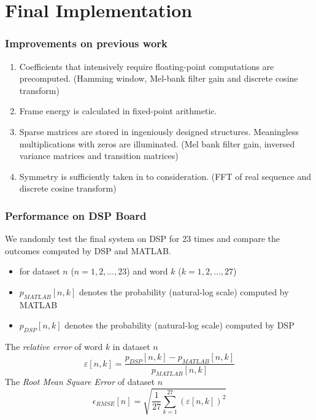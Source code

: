 \section{Final Implementation}


\begin{frame}
\frametitle{Improvements on previous work}
\begin{enumerate}
\item Coefficients that intensively require floating-point computations are precomputed. (Hamming window, Mel-bank filter gain and discrete cosine transform)
\item Frame energy is calculated in fixed-point arithmetic.
\item Sparse matrices are stored in ingeniously designed structures. Meaningless multiplications with zeros are illuminated. (Mel bank filter gain, inversed variance matrices and transition matrices)
\item Symmetry is sufficiently taken in to consideration. (FFT of real sequence and discrete cosine transform)
\end{enumerate}
\end{frame}


\begin{frame}
\frametitle{Performance on DSP Board}
We randomly test the final system on DSP for 23 times and compare the outcomes computed by DSP and MATLAB.
\begin{itemize}
	\item for dataset $n$ ($n = 1, 2, \dots, 23$) and word $k$ ($k = 1, 2, \dots, 27$)
	\item $p_{MATLAB}[n, k]$ denotes the probability (natural-log scale) computed by MATLAB
	\item $p_{DSP}[n, k]$ denotes the probability (natural-log scale) computed by DSP
\end{itemize}

The \textit{relative error} of word $k$ in dataset $n$
\begin{equation}
\varepsilon[n, k] = \frac{p_{DSP}[n, k] - p_{MATLAB}[n, k]}{p_{MATLAB}[n, k]}
\end{equation}
The \textit{Root Mean Square Error} of dataset $n$
\begin{equation}
\epsilon_{RMSE}[n] = \sqrt{\frac{1}{27} \sum_{k = 1}^{27} (\varepsilon[n, k])^2}
\end{equation}
\end{frame}

